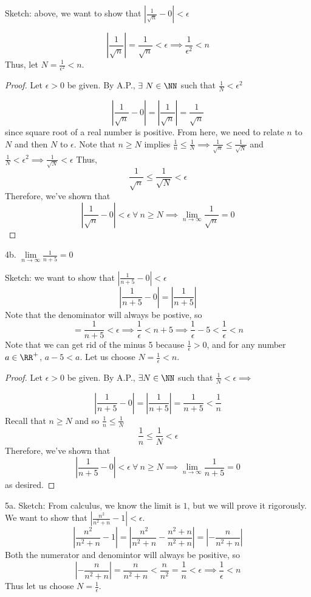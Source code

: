 \documentclass[12pt]{scrartcl}
\begin{document}
Sketch: above, we want to show that $|\frac{1}{\sqrt{n}}  - 0| < \epsilon$

\[|\frac{1}{\sqrt{n}}| = \frac{1}{\sqrt{n}} < \epsilon \implies \frac{1}{\epsilon^2} < n\]
Thus, let $N = \frac{1}{\epsilon^2} < n$. 

\begin{proof}
Let $\epsilon > 0$ be given. By A.P., $\exists \ N \in \NN$ such that $\frac{1}{N}< \epsilon^2$

\[|\frac{1}{\sqrt{n}} - 0| = |\frac{1}{\sqrt{n}}| = \frac{1}{\sqrt{n}}\]
since square root of a real number is positive. 
From here, we need to relate $n$ to $N$ and then $N$ to $\epsilon$. 
Note that $n \geq N$ implies $\frac{1}{n} \leq \frac{1}{N} \implies \frac{1}{\sqrt{n}} \leq \frac{1}{\sqrt{N}}$
and $\frac{1}{N} < \epsilon^2 \implies \frac{1}{\sqrt{N}} < \epsilon$
Thus, 
\[\frac{1}{\sqrt{n}} \leq \frac{1}{\sqrt{N}} <  \epsilon\]
Therefore, we've shown that
\[|\frac{1}{\sqrt{n}} - 0| < \epsilon \ \forall \ n \geq N\implies \lim_{n\to\infty}\frac{1}{\sqrt{n}} = 0\]
\end{proof}

4b. $\underset{n\to\infty}{\lim}\frac{1}{n + 5} = 0$

Sketch: we want to show that $|\frac{1}{n + 5} - 0| < \epsilon$
\[|\frac{1}{n + 5} - 0| = |\frac{1}{n + 5}|\]
Note that the denominator will always be postive, so 
\[ = \frac{1}{n + 5} < \epsilon \implies \frac{1}{\epsilon} < n + 5 \implies \frac{1}{\epsilon} - 5 < \frac{1}{\epsilon} < n\]
Note that we can get rid of the minus 5 because $\frac{1}{\epsilon} > 0$, and 
for any number $a \in \RR^+$, $a - 5 < a$. Let us choose $N = \frac{1}{\epsilon} < n$. 

\begin{proof}
  Let $\epsilon > 0$ be given. By A.P., $\exists N \in \NN$ such that $\frac{1}{N} < \epsilon \implies $

  \[|\frac{1}{n + 5} - 0| = |\frac{1}{n + 5}| = \frac{1}{n + 5} < \frac{1}{n}\]
  Recall that $n \geq N$ and so $\frac{1}{n} \leq \frac{1}{N}$
  \[\frac{1}{n} \leq \frac{1}{N} < \epsilon\]
  Therefore, we've shown that 
  \[|\frac{1}{n + 5} - 0| < \epsilon \ \forall \ n \geq N \implies \lim_{n\to\infty}\frac{1}{n+5} = 0\]
  as desired.
\end{proof}

\newpage

5a.  Sketch: From calculus, we know the limit is $1$, but we will prove it rigorously. 
We want to show that $|\frac{n^2}{n^2 + n} - 1| < \epsilon$. 
\[|\frac{n^2}{n^2 + n} - 1| = |\frac{n^2}{n^2 + n} - \frac{n^2+ n}{n^2 + n}| = |-\frac{n}{n^2 + n}|\]
Both the numerator and denomintor will always be positive, so
\[|-\frac{n}{n^2 + n}| = \frac{n}{n^2 + n} < \frac{n}{n^2} = \frac{1}{n} < \epsilon \implies \frac{1}{\epsilon} < n\]
Thus let us choose $N = \frac{1}{\epsilon}$.
\end{document}

